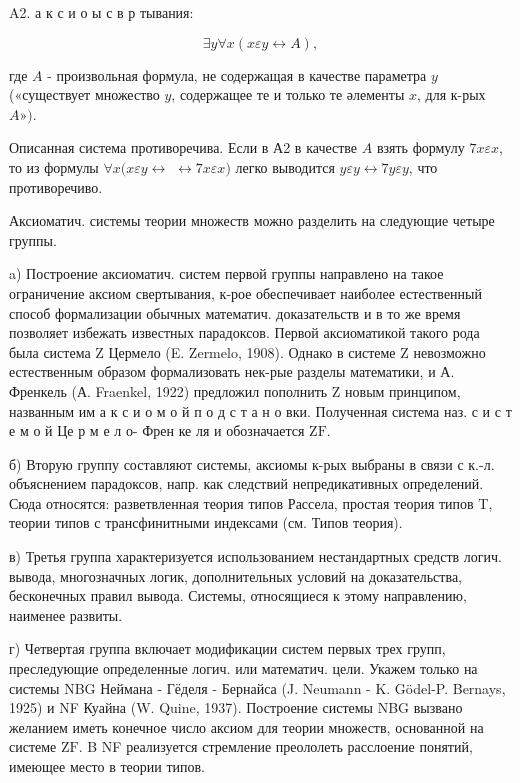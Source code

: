 \documentclass[10pt]{article}
\begin{document}
A2. а к с и о ы с в р тывания:



\[

\exists y \forall x(x \varepsilon y \leftrightarrow A),

\]



где $A$ - произвольная формула, не содержащая в качестве параметра $y$ («существует множество $y$, содержащее те и только те әлементы $x$, для к-рых $A »)$.



Описанная система противоречива. Если в А2 в качестве $A$ взять формулу $7 x \varepsilon x$, то из формулы $\forall x(x \varepsilon y \leftrightarrow$ $\leftrightarrow 7 x \varepsilon x)$ легко выводится $y \varepsilon y \leftrightarrow 7 y \varepsilon y$, что противоречиво.



Аксиоматич. системы теории множеств можно разделить на следующие четыре группы.



a) Построение аксиоматич. систем первой группы направлено на такое ограничение аксиом свертывания, к-рое обеспечивает наиболее естественный способ формализации обычных математич. доказательств и в то же время позволяет избежать известных парадоксов. Первой аксиоматикой такого рода была система Z Цермело (E. Zermelo, 1908). Однако в системе Z невозможно естественным образом формализовать нек-рые разделы математики, и А. Френкель (А. Fraenkel, 1922) предложил пополнить $\mathrm{Z}$ новым принципом, названным им а к с и о м о й п о д с т а н о вки. Полученная система наз. с и с т е м о й Це р м е л о- Френ ке ля и обозначается $\mathrm{ZF}$.



б) Вторую группу составляют системы, аксиомы к-рых выбраны в связи с к.-л. объяснением парадоксов, напр. как следствий непредикативных определений. Сюда относятся: разветвленная теория типов Рассела, простая теория типов T, теории типов с трансфинитными индексами (см. Типов теория).



в) Третья группа характеризуется использованием нестандартных средств логич. вывода, многозначных логик, дополнительных условий на доказательства, бесконечных правил вывода. Системы, относящиеся к этому направлению, наименее развиты.



г) Четвертая группа включает модификации систем первых трех групп, преследующие определенные логич. или математич. цели. Укажем только на системы NBG Неймана - Гёделя - Бернайса (J. Neumann - K. Gödel-P. Bernays, 1925) и NF Куайна (W. Quine, 1937). Построение системы NBG вызвано желанием иметь конечное число аксиом для теории множеств, основанной на системе $\mathrm{ZF}$. B NF реализуется стремление преололеть расслоение понятий, имеющее место в теории типов.
\end{document}
